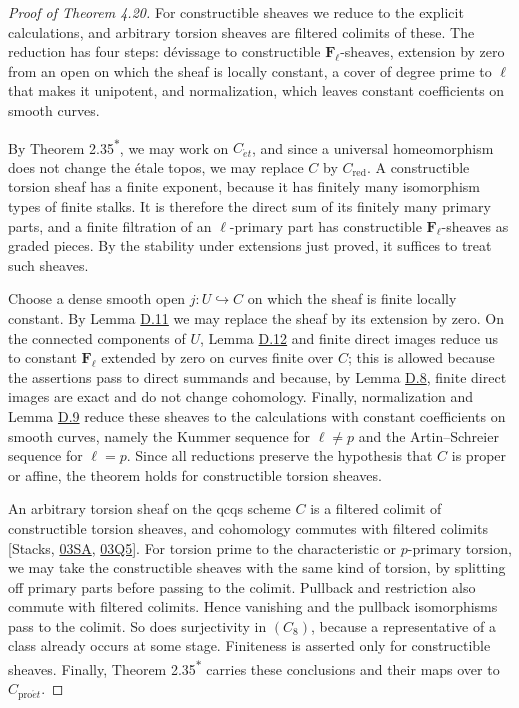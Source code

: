 \documentclass[11pt]{article}
\newcommand{\bpout}[1]{#1\textsuperscript{\hyperlink{bp-outside}{\ensuremath{\ast}}}}
\begin{document}
\begin{proof}[{Proof of Theorem 4.20}]\label{bp49}%
For constructible sheaves we reduce to the explicit calculations, and arbitrary torsion sheaves are filtered colimits of these. The reduction has four steps: dévissage to constructible \(\mathbf F_\ell\)-sheaves, extension by zero from an open on which the sheaf is locally constant, a cover of degree prime to \(\ell\) that makes it unipotent, and normalization, which leaves constant coefficients on smooth curves.

By Theorem \bpout{2.35}, we may work on \(C_{\acute{e}t}\), and since a universal homeomorphism does not change the étale topos, we may replace \(C\) by \(C_{\mathrm{red}}\).  A constructible torsion sheaf has a finite exponent, because it has finitely many isomorphism types of finite stalks.  It is therefore the direct sum of its finitely many primary parts, and a finite filtration of an \(\ell\)-primary part has constructible \(\mathbf F_\ell\)-sheaves as graded pieces.  By the stability under extensions just proved, it suffices to treat such sheaves.

Choose a dense smooth open \(j:U\hookrightarrow C\) on which the sheaf is finite locally constant.  By Lemma \hyperref[bp39]{D.11} we may replace the sheaf by its extension by zero.  On the connected components of \(U\), Lemma \hyperref[bp44]{D.12} and finite direct images reduce us to constant \(\mathbf F_\ell\) extended by zero on curves finite over \(C\); this is allowed because the assertions pass to direct summands and because, by Lemma \hyperref[bp28]{D.8}, finite direct images are exact and do not change cohomology.  Finally, normalization and Lemma \hyperref[bp31]{D.9} reduce these sheaves to the calculations with constant coefficients on smooth curves, namely the Kummer sequence for \(\ell\ne p\) and the Artin–Schreier sequence for \(\ell=p\).  Since all reductions preserve the hypothesis that \(C\) is proper or affine, the theorem holds for constructible torsion sheaves.

An arbitrary torsion sheaf on the qcqs scheme \(C\) is a filtered colimit of constructible torsion sheaves, and cohomology commutes with filtered colimits [Stacks, \href{https://stacks.math.columbia.edu/tag/03SA}{03SA}, \href{https://stacks.math.columbia.edu/tag/03Q5}{03Q5}].  For torsion prime to the characteristic or \(p\)-primary torsion, we may take the constructible sheaves with the same kind of torsion, by splitting off primary parts before passing to the colimit. Pullback and restriction also commute with filtered colimits. Hence vanishing and the pullback isomorphisms pass to the colimit. So does surjectivity in \((C_8)\), because a representative of a class already occurs at some stage. Finiteness is asserted only for constructible sheaves. Finally, Theorem \bpout{2.35} carries these conclusions and their maps over to \(C_{\mathrm{pro}\acute{e}t}\).
\end{proof}
\end{document}
